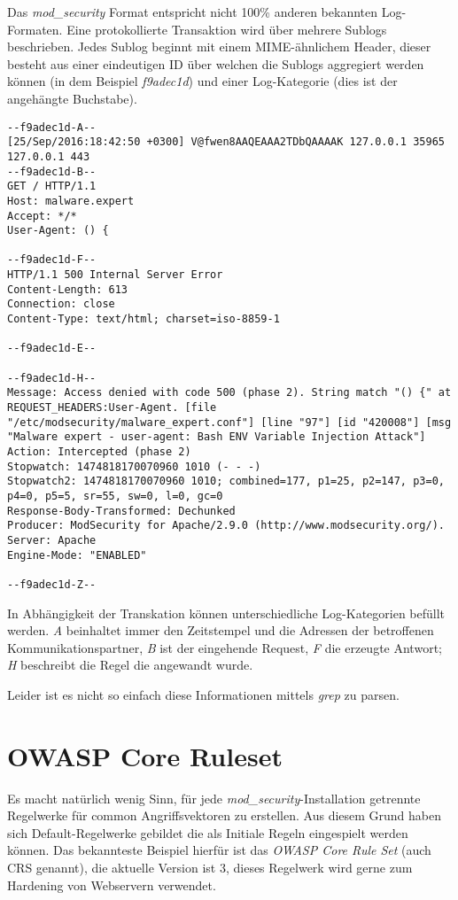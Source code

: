 Das \textit{mod\_security} Format entspricht nicht 100\% anderen bekannten Log-Formaten. Eine protokollierte Transaktion wird über mehrere Sublogs beschrieben. Jedes Sublog beginnt mit einem MIME-ähnlichem Header, dieser besteht aus einer eindeutigen ID über welchen die Sublogs aggregiert werden können (in dem Beispiel \textit{f9adec1d}) und einer Log-Kategorie (dies ist der angehängte Buchstabe).

\begin{verbatim}
--f9adec1d-A--
[25/Sep/2016:18:42:50 +0300] V@fwen8AAQEAAA2TDbQAAAAK 127.0.0.1 35965 127.0.0.1 443
--f9adec1d-B--
GET / HTTP/1.1
Host: malware.expert
Accept: */*
User-Agent: () {

--f9adec1d-F--
HTTP/1.1 500 Internal Server Error
Content-Length: 613
Connection: close
Content-Type: text/html; charset=iso-8859-1

--f9adec1d-E--

--f9adec1d-H--
Message: Access denied with code 500 (phase 2). String match "() {" at REQUEST_HEADERS:User-Agent. [file "/etc/modsecurity/malware_expert.conf"] [line "97"] [id "420008"] [msg "Malware expert - user-agent: Bash ENV Variable Injection Attack"]
Action: Intercepted (phase 2)
Stopwatch: 1474818170070960 1010 (- - -)
Stopwatch2: 1474818170070960 1010; combined=177, p1=25, p2=147, p3=0, p4=0, p5=5, sr=55, sw=0, l=0, gc=0
Response-Body-Transformed: Dechunked
Producer: ModSecurity for Apache/2.9.0 (http://www.modsecurity.org/).
Server: Apache
Engine-Mode: "ENABLED"

--f9adec1d-Z--
\end{verbatim}

In Abhängigkeit der Transkation können unterschiedliche Log-Kategorien befüllt werden. \textit{A} beinhaltet immer den Zeitstempel und die Adressen der betroffenen Kommunikationspartner, \textit{B} ist der eingehende Request, \textit{F} die erzeugte Antwort; \textit{H} beschreibt die Regel die angewandt wurde.

Leider ist es nicht so einfach diese Informationen mittels \textit{grep} zu parsen.

\section{OWASP Core Ruleset}

Es macht natürlich wenig Sinn, für jede \textit{mod\_security}-Installation getrennte Regelwerke für common Angriffsvektoren zu erstellen. Aus diesem Grund haben sich Default-Regelwerke gebildet die als Initiale Regeln eingespielt werden können. Das bekannteste Beispiel hierfür ist das \textit{OWASP Core Rule Set} (auch CRS genannt), die aktuelle Version ist 3, dieses Regelwerk wird gerne zum Hardening von Webservern verwendet.

